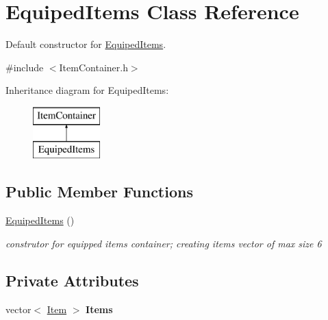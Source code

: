 \hypertarget{class_equiped_items}{}\section{Equiped\+Items Class Reference}
\label{class_equiped_items}


Default constructor for \hyperlink{class_equiped_items}{Equiped\+Items}.  




{\ttfamily \#include $<$Item\+Container.\+h$>$}

Inheritance diagram for Equiped\+Items\+:\begin{figure}[H]
\begin{center}
\leavevmode
\includegraphics[height=2.000000cm]{class_equiped_items}
\end{center}
\end{figure}
\subsection*{Public Member Functions}
\begin{DoxyCompactItemize}
\item 
\hypertarget{class_equiped_items_aedf9e1d46d0c42cdd905bbd08f356b29}{}\label{class_equiped_items_aedf9e1d46d0c42cdd905bbd08f356b29} 
\hyperlink{class_equiped_items_aedf9e1d46d0c42cdd905bbd08f356b29}{Equiped\+Items} ()
\begin{DoxyCompactList}\small\item\em construtor for equipped items container; creating items vector of max size 6 \end{DoxyCompactList}\end{DoxyCompactItemize}
\subsection*{Private Attributes}
\begin{DoxyCompactItemize}
\item 
\hypertarget{class_equiped_items_abdf614a856ff41f78fde1152de2cfd4c}{}\label{class_equiped_items_abdf614a856ff41f78fde1152de2cfd4c} 
vector$<$ \hyperlink{class_item}{Item} $>$ {\bfseries Items}
\end{DoxyCompactItemize}


